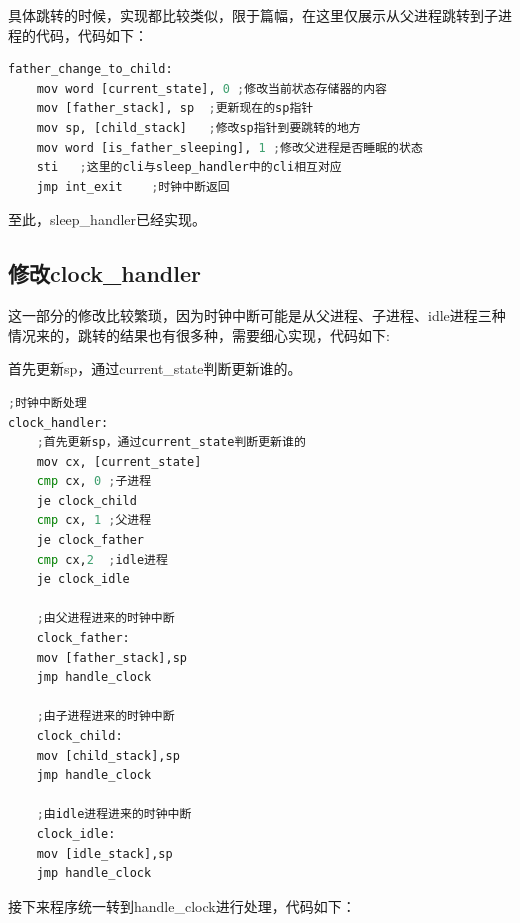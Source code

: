 \documentclass{LabReport}
\begin{document}
	具体跳转的时候，实现都比较类似，限于篇幅，在这里仅展示从父进程跳转到子进程的代码，代码如下：
	
\begin{lstlisting}[language=python,frame=shadowbox]
father_change_to_child:
	mov word [current_state], 0	;修改当前状态存储器的内容
	mov [father_stack], sp	;更新现在的sp指针
	mov sp, [child_stack]	;修改sp指针到要跳转的地方
	mov word [is_father_sleeping], 1 ;修改父进程是否睡眠的状态
	sti   ;这里的cli与sleep_handler中的cli相互对应
	jmp int_exit	;时钟中断返回
\end{lstlisting}
	
	至此，sleep\_handler已经实现。

	\subsection{修改clock\_handler}
	这一部分的修改比较繁琐，因为时钟中断可能是从父进程、子进程、idle进程三种情况来的，跳转的结果也有很多种，需要细心实现，代码如下:
	
	首先更新sp，通过current\_state判断更新谁的。
\begin{lstlisting}[language=python,frame=shadowbox]
;时钟中断处理
clock_handler:
	;首先更新sp，通过current_state判断更新谁的
	mov cx, [current_state]
	cmp cx, 0 ;子进程
	je clock_child
	cmp cx, 1 ;父进程
	je clock_father
	cmp cx,2  ;idle进程
	je clock_idle
	
	;由父进程进来的时钟中断
	clock_father:
	mov [father_stack],sp
	jmp handle_clock
	
	;由子进程进来的时钟中断
	clock_child:
	mov [child_stack],sp
	jmp handle_clock
	
	;由idle进程进来的时钟中断
	clock_idle:
	mov [idle_stack],sp
	jmp handle_clock
\end{lstlisting}

	接下来程序统一转到handle\_clock进行处理，代码如下：
	
\end{document}
